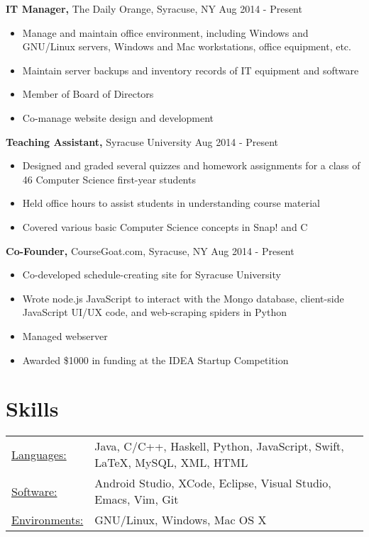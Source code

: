 \documentclass[margin]{res}
\begin{document}
\begin{resume}
{\bf IT Manager,} The Daily Orange, Syracuse, NY \hfill  Aug 2014 - Present
\begin{itemize} \itemsep -2pt %
\item Manage and maintain office environment, including Windows and GNU/Linux servers, Windows and Mac workstations, office equipment, etc.
\item Maintain server backups and inventory records of IT equipment and software
\item Member of Board of Directors
\item Co-manage website design and development
\end{itemize}

{\bf Teaching Assistant,} Syracuse University \hfill  Aug 2014 - Present
\begin{itemize} \itemsep -2pt %
\item Designed and graded several quizzes and homework assignments for a class of 46 Computer Science first-year students
\item Held office hours to assist students in understanding course material
\item Covered various basic Computer Science concepts in Snap! and C
\end{itemize}

{\bf Co-Founder,} CourseGoat.com, Syracuse, NY \hfill
Aug 2014 - Present            
\begin{itemize} \itemsep -2pt
\item  Co-developed schedule-creating site for Syracuse University
\item Wrote node.js JavaScript to interact with the Mongo database, client-side JavaScript UI/UX code, and web-scraping spiders in Python
\item Managed webserver
\item Awarded \$1000 in funding at the IDEA Startup Competition
\end{itemize}




 

\section{Skills}
   \begin{tabular}{l p{3in}}
    \underline{Languages:} & Java, C/C++, Haskell, Python, JavaScript, Swift, \LaTeX , MySQL, XML, HTML \\
     \underline{Software:} & Android Studio, XCode, Eclipse, Visual Studio, Emacs, Vim, Git  \\
     \underline{Environments:} & GNU/Linux, Windows, Mac OS X
     

\end{tabular}
\end{resume}
\end{document}
